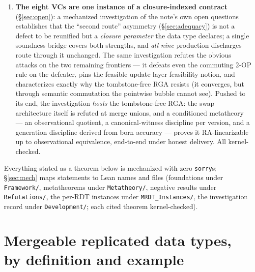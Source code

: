 \documentclass[11pt]{article}
\newcommand{\lean}[1]{\texttt{#1}}
\begin{document}
\begin{enumerate}[leftmargin=2em]
  OR-set, an optimized OR-set, enable-wins flag, grow-only set and map,
  increment-only and PN counters, a tombstone RGA, Peritext, the
  multi-valued register and the add-wins priority queue --- are
  discharged end-to-end, kernel-checked; the twelfth, the tombstone-free
  RGA, goes through the conditioned framework. The sweep produces an empirical
  \emph{class map} of which data types need which strength of contract,
  with two surprises: tombstones are a metatheoretic trivializer, and
  commutativity class and delta class are independent axes.
\item \textbf{The eight VCs are one instance of a closure-indexed
  contract} (\S\ref{sec:open}): a mechanized investigation of the note's
  own open questions establishes that the ``second route'' asymmetry
  (\S\ref{sec:adequacy}) is not a defect to be reunified but a
  \emph{closure parameter} the data type declares; a single soundness
  bridge covers both strengths, and \emph{all nine} production discharges
  route through it unchanged. The same investigation refutes the obvious
  attacks on the two remaining frontiers --- it defeats even the commuting
  \textsc{2-OP} rule on the defeater, pins the feasible-update-layer
  feasibility notion, and characterizes exactly why the tombstone-free RGA
  resists (it converges, but through semantic commutation the pointwise
  bubble cannot see). Pushed to its end, the investigation \emph{hosts}
  the tombstone-free RGA: the swap architecture itself is refuted at merge
  unions, and a conditioned metatheory --- an observational quotient, a
  canonical-witness discipline per version, and a generation discipline
  derived from born accuracy --- proves it RA-linearizable up to
  observational equivalence, end-to-end under honest delivery. All
  kernel-checked.
\end{enumerate}

Everything stated as a theorem below is mechanized with zero
\lean{sorry}s; \S\ref{sec:mech} maps statements to Lean names and files
(foundations under \lean{Framework/}, metatheorems under
\lean{Metatheory/}, negative results under \lean{Refutations/}, the
per-RDT instances under \lean{MRDT\_Instances/}, the investigation record
under \lean{Development/}; each cited theorem kernel-checked).


\section{Mergeable replicated data types, by definition and example}
\label{sec:mrdts}
\end{document}

